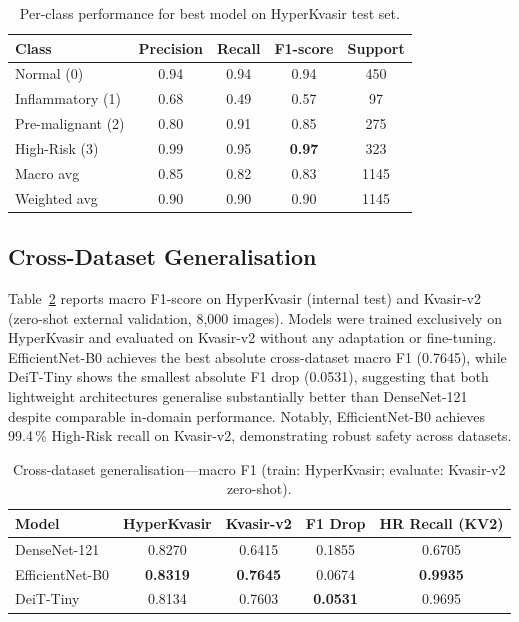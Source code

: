 \documentclass[11pt,a4paper]{article}
\begin{document}
\begin{table}[H]
\centering
\caption{Per-class performance for best model on HyperKvasir test set.}
\label{tab:per_class}
\begin{tabular}{lcccc}
\toprule
\textbf{Class} & \textbf{Precision} & \textbf{Recall} & \textbf{F1-score}
& \textbf{Support}\\
\midrule
Normal (0)        & 0.94 & 0.94 & 0.94 & 450\\
Inflammatory (1)  & 0.68 & 0.49 & 0.57 &  97\\
Pre-malignant (2) & 0.80 & 0.91 & 0.85 & 275\\
High-Risk (3)     & 0.99 & 0.95 & \textbf{0.97} & 323\\
\midrule
Macro avg         & 0.85 & 0.82 & 0.83 & 1145\\
Weighted avg      & 0.90 & 0.90 & 0.90 & 1145\\
\bottomrule
\end{tabular}
\end{table}

\subsection{Cross-Dataset Generalisation}

Table~\ref{tab:xdataset} reports macro F1-score on HyperKvasir (internal
test) and Kvasir-v2 (zero-shot external validation, 8,000 images). Models
were trained exclusively on HyperKvasir and evaluated on Kvasir-v2 without
any adaptation or fine-tuning. EfficientNet-B0 achieves the best absolute cross-dataset macro F1 (0.7645),
while DeiT-Tiny shows the smallest absolute F1 drop (0.0531),
suggesting that both lightweight architectures generalise substantially
better than DenseNet-121 despite comparable in-domain performance. Notably, EfficientNet-B0 achieves 99.4\,\%
High-Risk recall on Kvasir-v2, demonstrating robust safety across datasets.

\begin{table}[H]
\centering
\caption{Cross-dataset generalisation---macro F1 (train: HyperKvasir;
  evaluate: Kvasir-v2 zero-shot).}
\label{tab:xdataset}
\begin{tabular}{lcccc}
\toprule
\textbf{Model} & \textbf{HyperKvasir} &
\textbf{Kvasir-v2} & \textbf{F1 Drop} & \textbf{HR Recall (KV2)}\\
\midrule
DenseNet-121    & 0.8270 & 0.6415 & 0.1855 & 0.6705\\
EfficientNet-B0 & \textbf{0.8319} & \textbf{0.7645} & 0.0674 & \textbf{0.9935}\\
DeiT-Tiny       & 0.8134 & 0.7603 & \textbf{0.0531} & 0.9695\\
\bottomrule
\end{tabular}
\end{table}
\end{document}
